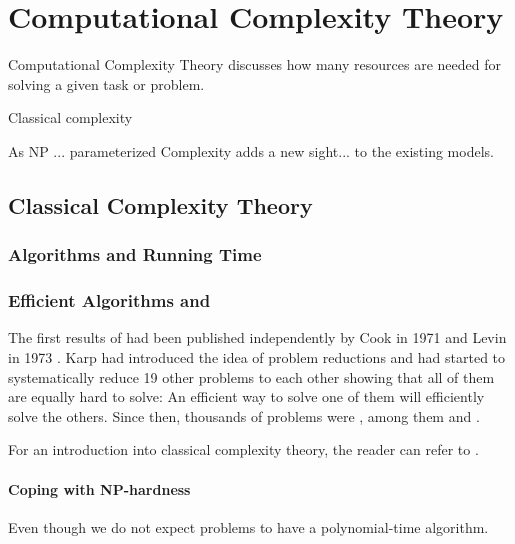 \section{Computational Complexity Theory}

Computational Complexity Theory discusses how many resources are needed for solving a given task or problem. 

Classical complexity

As NP ... parameterized Complexity adds a new sight... to the existing models.


\subsection{Classical Complexity Theory}


\subsubsection*{Algorithms and Running Time}

\subsubsection*{Efficient Algorithms and \NPcn}

The first results of \NPcn had been published independently by Cook \cite{Cook1971} in 1971 and Levin in 1973 \cite{Levin1973}. 
Karp \cite{Karp1972} had introduced the idea of problem reductions and had started to systematically reduce 19 other problems to each other showing that all of them are equally hard to solve: An efficient way to solve one of them will efficiently solve the others. Since then, thousands of problems were \NPc, among them \dom and \sdom. 


% 

For an introduction into classical complexity theory, the reader can refer to \cite{Arora2006}.

\paragraph{Coping with NP-hardness}

Even though we do not expect \NPc problems to have a polynomial-time algorithm.

